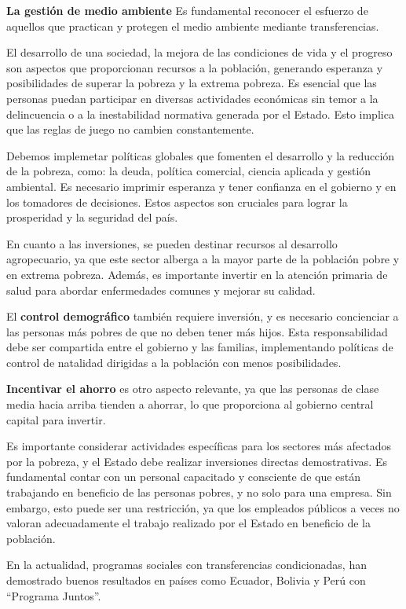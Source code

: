\documentclass[
  letterpaper,
  DIV=11,
  numbers=noendperiod]{scrartcl}
\begin{document}
\textbf{La gestión de medio ambiente} Es fundamental reconocer el
esfuerzo de aquellos que practican y protegen el medio ambiente mediante
transferencias.

El desarrollo de una sociedad, la mejora de las condiciones de vida y el
progreso son aspectos que proporcionan recursos a la población,
generando esperanza y posibilidades de superar la pobreza y la extrema
pobreza. Es esencial que las personas puedan participar en diversas
actividades económicas sin temor a la delincuencia o a la inestabilidad
normativa generada por el Estado. Esto implica que las reglas de juego
no cambien constantemente.

Debemos implemetar políticas globales que fomenten el desarrollo y la
reducción de la pobreza, como: la deuda, política comercial, ciencia
aplicada y gestión ambiental. Es necesario imprimir esperanza y tener
confianza en el gobierno y en los tomadores de decisiones. Estos
aspectos son cruciales para lograr la prosperidad y la seguridad del
país.

En cuanto a las inversiones, se pueden destinar recursos al desarrollo
agropecuario, ya que este sector alberga a la mayor parte de la
población pobre y en extrema pobreza. Además, es importante invertir en
la atención primaria de salud para abordar enfermedades comunes y
mejorar su calidad.

El \textbf{control demográfico} también requiere inversión, y es
necesario concienciar a las personas más pobres de que no deben tener
más hijos. Esta responsabilidad debe ser compartida entre el gobierno y
las familias, implementando políticas de control de natalidad dirigidas
a la población con menos posibilidades.

\textbf{Incentivar el ahorro} es otro aspecto relevante, ya que las
personas de clase media hacia arriba tienden a ahorrar, lo que
proporciona al gobierno central capital para invertir.

Es importante considerar actividades específicas para los sectores más
afectados por la pobreza, y el Estado debe realizar inversiones directas
demostrativas. Es fundamental contar con un personal capacitado y
consciente de que están trabajando en beneficio de las personas pobres,
y no solo para una empresa. Sin embargo, esto puede ser una restricción,
ya que los empleados públicos a veces no valoran adecuadamente el
trabajo realizado por el Estado en beneficio de la población.

En la actualidad, programas sociales con transferencias condicionadas,
han demostrado buenos resultados en países como Ecuador, Bolivia y Perú
con ``Programa Juntos''.
\end{document}
